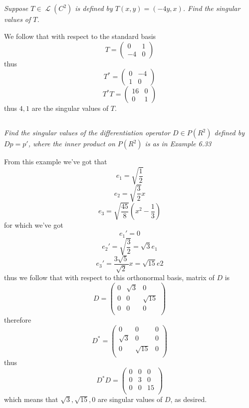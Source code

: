 \documentclass[11pt,oneside,titlepage]{book}
\DeclareMathOperator \map {\mathcal {L}}
\begin{document}
\subsection{}

\textit{Suppose $T \in \map(C^2)$ is defined by $T(x, y) = (-4y, x)$. Find the singular values
  of $T$.}

We follow that with respect to the standard basis
$$T =
\begin{pmatrix}
  0 & 1 \\
  -4 & 0
\end{pmatrix}
$$
thus
$$T^* =
\begin{pmatrix}
  0 & -4 \\
  1 & 0
\end{pmatrix}
$$
$$T^* T =
\begin{pmatrix}
  16 & 0 \\
  0 & 1
\end{pmatrix}
$$
thus $4, 1$ are the singular values of $T$.

\subsection{}

\textit{Find the singular values of the differentiation operator $D \in P(R^2)$ defined
  by $Dp = p'$, where the inner product on $P(R^2)$ is as in Example 6.33}

From this example we've got that
$$e_1 = \sqrt{\frac 1 2 }$$
$$e_2 = \sqrt{\frac 3 2} x$$
$$e_3 = \sqrt{\frac{45}{8}}(x^2 -  \frac 1 3)$$
for which we've got 
$$e_1' = 0$$
$$e_2' = \sqrt{\frac 3 2} = \sqrt{3} e_1$$
$$e_3' = \frac{3 \sqrt{5}}{\sqrt{2}}x = \sqrt{15} e2$$
thus we follow that with respect to this orthonormal basis, matrix of $D$ is 
$$
D =
\begin{pmatrix}
  0 & \sqrt{3} & 0\\
  0 & 0 & \sqrt{15}\\
  0 & 0 & 0\\
\end{pmatrix}
$$
therefore
$$
D^* =
\begin{pmatrix}
  0 & 0 & 0\\
  \sqrt{3} & 0 & 0\\
  0 & \sqrt{15} & 0\\
\end{pmatrix}
$$
thus
$$
D^*D =
\begin{pmatrix}
  0 & 0 & 0\\
  0 & 3 & 0\\
  0 & 0 & 15\\
\end{pmatrix}
$$
which means that $\sqrt{3}, \sqrt{15}, 0$ are singular values of $D$, as desired.
\end{document}
